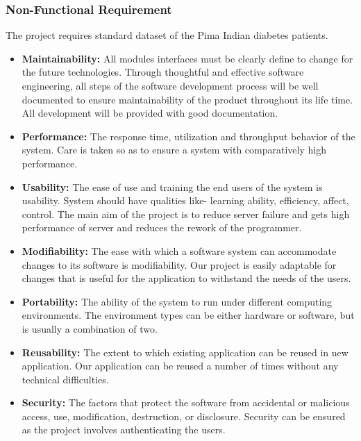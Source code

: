 \documentclass[a4paper,14pt,onecolumn]{article}
\begin{document}
\subsubsection{Non-Functional Requirement}
The project requires standard dataset of the Pima Indian diabetes patients.
   \begin{itemize}
   \item\textbf{Maintainability:} All modules interfaces must be clearly define to change for the future technologies. Through thoughtful and effective software engineering, all steps of the software development process will be well documented to ensure maintainability of the product throughout its life time. All development will be provided with good documentation.
   \item \textbf{Performance:} The response time, utilization and throughput behavior of the system. Care is taken so as to ensure a system with comparatively high performance.
   \item \textbf{Usability:} The ease of use and training the end users of the system is usability. System should have qualities like- learning ability, efficiency, affect, control. The main aim of the project is to reduce server failure and gets high performance of server and reduces the rework of the programmer.
   \item \textbf{Modifiability:} The ease with which a software system can accommodate changes to its software is modifiability. Our project is easily adaptable for changes that is useful for the application to withstand the needs of the users.
   \item \textbf{Portability:} The ability of the system to run under different computing environments. The environment types can be either hardware or software, but is usually a combination of two.
   \item \textbf{Reusability:} The extent to which existing application can be reused in new application. Our application can be reused a number of times without any technical difficulties.
   \item \textbf{Security:} The factors that protect the software from accidental or malicious access, use, modification, destruction, or disclosure. Security can be ensured as the project involves authenticating the users.
   \end{itemize}
\end{document}
